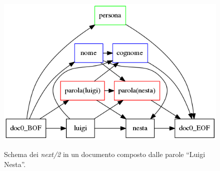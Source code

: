 \begin{figure}[H]
\centering
\includegraphics[width=\textwidth]{img/nuovitag.png}
\label{fig:nuovitag}
\caption[Esempio di ``next'']{Schema dei \emph{next/2} in un documento composto dalle parole ``Luigi Nesta''.}
\end{figure}
